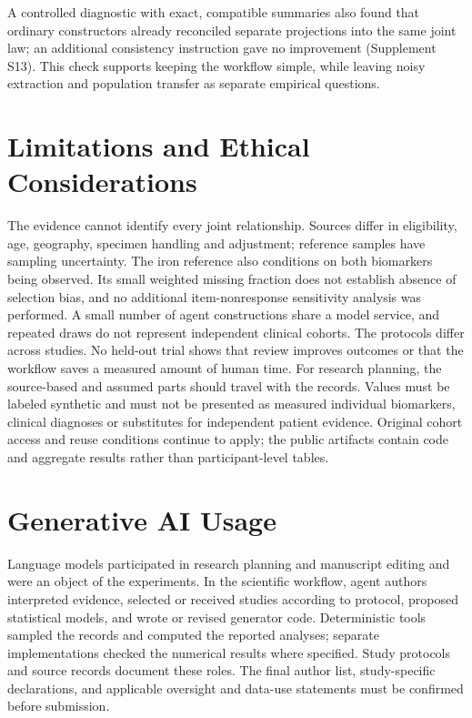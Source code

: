 \documentclass[11pt,letterpaper]{article}
\begin{document}
A controlled diagnostic with exact, compatible summaries also found that ordinary constructors already reconciled separate projections into the same joint law; an additional consistency instruction gave no improvement (Supplement S13). This check supports keeping the workflow simple, while leaving noisy extraction and population transfer as separate empirical questions.


\section{Limitations and Ethical Considerations}

The evidence cannot identify every joint relationship. Sources differ in eligibility, age, geography, specimen handling and adjustment; reference samples have sampling uncertainty. The iron reference also conditions on both biomarkers being observed. Its small weighted missing fraction does not establish absence of selection bias, and no additional item-nonresponse sensitivity analysis was performed. A small number of agent constructions share a model service, and repeated draws do not represent independent clinical cohorts. The protocols differ across studies. No held-out trial shows that review improves outcomes or that the workflow saves a measured amount of human time. For research planning, the source-based and assumed parts should travel with the records. Values must be labeled synthetic and must not be presented as measured individual biomarkers, clinical diagnoses or substitutes for independent patient evidence. Original cohort access and reuse conditions continue to apply; the public artifacts contain code and aggregate results rather than participant-level tables.


\section{Generative AI Usage}

Language models participated in research planning and manuscript editing and were an object of the experiments. In the scientific workflow, agent authors interpreted evidence, selected or received studies according to protocol, proposed statistical models, and wrote or revised generator code. Deterministic tools sampled the records and computed the reported analyses; separate implementations checked the numerical results where specified. Study protocols and source records document these roles. The final author list, study-specific declarations, and applicable oversight and data-use statements must be confirmed before submission.
\end{document}
